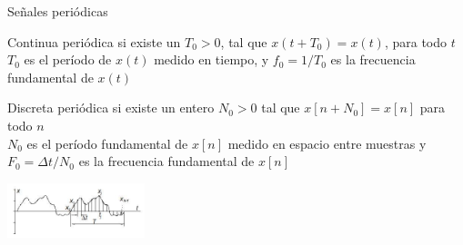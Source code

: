  \begin{frame}{Señales periódicas}
    \begin{block}{Continua periódica}
       si existe un $T_0>0$, tal que $x(t+T_0)=x(t)$, para todo $t$\\
       $T_0$ es el período de $x(t)$ medido en tiempo, y $f_0=1/T_0$ es la frecuencia fundamental de $x(t)$
    \end{block}
    \begin{block}{Discreta periódica}
       si existe un entero $N_0>0$ tal que $x[n+N_0]=x[n]$ para
       todo $n$ \\
       $N_0$ es el período fundamental de $x[n]$ medido en espacio entre muestras
       y  $F_0=\Delta t/N_0$ es la frecuencia fundamental de $x[n]$
    \end{block}
    \center\includegraphics[width=0.3\textwidth]{1_clase/periodica}
    \vfill
 \end{frame}
